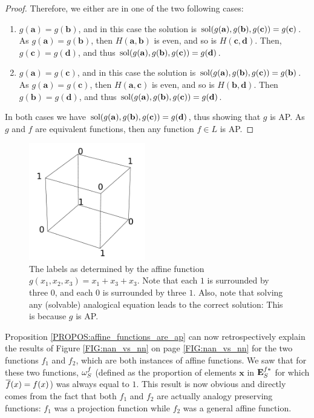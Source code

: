 \begin{proof}
  Therefore, we either are in one of the two following cases:
  \begin{enumerate}
    \item $g(\mathbf{a}) = g(\mathbf{b})$, and in this case the solution is
      $\text{sol}(g(\mathbf{a}), g(\mathbf{b}), g(\mathbf{c})) = g(\mathbf{c})$. As
      $g(\mathbf{a}) = g(\mathbf{b})$, then $H(\mathbf{a}, \mathbf{b})$ is
      even, and so is $H(\mathbf{c}, \mathbf{d})$. Then, $g(\mathbf{c}) =
      g(\mathbf{d})$, and thus $\text{sol}(g(\mathbf{a}), g(\mathbf{b}),
      g(\mathbf{c})) = g(\mathbf{d})$.
    \item $g(\mathbf{a}) = g(\mathbf{c})$, and in this case the solution is
      $\text{sol}(g(\mathbf{a}), g(\mathbf{b}), g(\mathbf{c})) = g(\mathbf{b})$. As
      $g(\mathbf{a}) = g(\mathbf{c})$, then $H(\mathbf{a}, \mathbf{c})$ is
      even, and so is $H(\mathbf{b}, \mathbf{d})$. Then $g(\mathbf{b}) =
      g(\mathbf{d})$, and thus $\text{sol}(g(\mathbf{a}), g(\mathbf{b}),
      g(\mathbf{c})) = g(\mathbf{d})$.
  \end{enumerate}

  In both cases we have $\text{sol}(g(\mathbf{a}), g(\mathbf{b}), g(\mathbf{c})) =
  g(\mathbf{d})$, thus showing that $g$ is AP.
  As $g$ and $f$ are equivalent functions, then any function $f \in L$ is AP.
\end{proof}

\begin{figure}[!h]
\centering
  \includegraphics[width=2in]{figures/affine_functions_neighbors.pdf}
  \caption{The labels as determined by the affine function $g(x_1, x_2, x_3) =
  x_1 + x_3 + x_3$. Note that each $1$ is surrounded by three $0$, and each $0$
  is surrounded by three $1$. Also, note that solving any (solvable) analogical
  equation leads to the correct solution: This is because $g$ is AP.}
  \label{FIG:affine_functions_neighbors}
\end{figure}

Proposition \ref{PROPOS:affine_functions_are_ap} can now retrospectively
explain the results of Figure \ref{FIG:nan_vs_nn} on page \ref{FIG:nan_vs_nn}
for the two functions $f_1$ and $f_2$, which are both instances of affine
functions. We saw that for these two functions, $\omega_{S}^{f}$ (defined as the
proportion of elements $\mathbf{x}$ in $\mathbf{E}_{S}^{f*}$ for which $\overline{f}(x) = f(x)$) was
always equal to $1$. This result is now obvious and directly comes from the
fact that both $f_1$ and $f_2$ are actually analogy preserving functions: $f_1$
was a projection function while $f_2$ was a general affine function.

